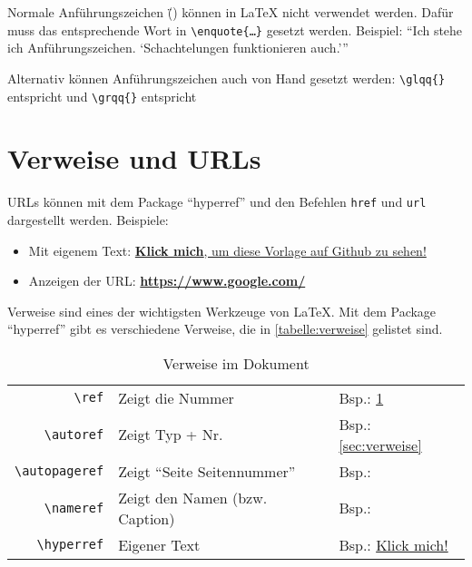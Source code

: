 Normale Anführungszeichen (\"{}) können in \LaTeX{} nicht verwendet werden. Dafür muss das entsprechende Wort in \texttt{\textbackslash enquote{\{\ldots\}}} gesetzt werden. Beispiel: \enquote{Ich stehe ich Anführungszeichen. \enquote{Schachtelungen funktionieren auch.}}

Alternativ können Anführungszeichen auch von Hand gesetzt werden:
\texttt{\textbackslash glqq\{\}} entspricht \glqq{} und \texttt{\textbackslash grqq\{\}} entspricht \grqq{}

\section{Verweise und URLs}\label{sec:verweise}
URLs können mit dem Package \enquote{hyperref} und den Befehlen \texttt{href} und \texttt{url} dargestellt werden. Beispiele:

\begin{itemize}
	\item Mit eigenem Text: \href{https://github.com/LaTeX-Template-PA-DHBW-Karlsruhe/}{\textbf{Klick mich}, um diese Vorlage auf Github zu sehen!}
	\item Anzeigen der URL: \textbf{\url{https://www.google.com/}}
\end{itemize}

Verweise sind eines der wichtigsten Werkzeuge von \LaTeX. Mit dem Package \enquote{hyperref} gibt es verschiedene Verweise, die in \autoref{tabelle:verweise} gelistet sind.

\begin{table}[ht]
	\centering
	\begin{tabular}{rll}
		        \texttt{\textbackslash ref} & Zeigt die Nummer                   & Bsp.: \ref{sec:verweise}                   \\
		    \texttt{\textbackslash autoref} & Zeigt Typ + Nr.                    & Bsp.: \autoref{sec:verweise}               \\
		\texttt{\textbackslash autopageref} & Zeigt \enquote{Seite Seitennummer} & Bsp.: \autopageref{sec:verweise}           \\
		    \texttt{\textbackslash nameref} & Zeigt den Namen (bzw. Caption)     & Bsp.: \nameref{sec:verweise}               \\
		   \texttt{\textbackslash hyperref} & Eigener Text                       & Bsp.: \hyperref[sec:verweise]{Klick mich!}
	\end{tabular}
	\caption{Verweise im Dokument}
	\label{tabelle:verweise}
\end{table}
